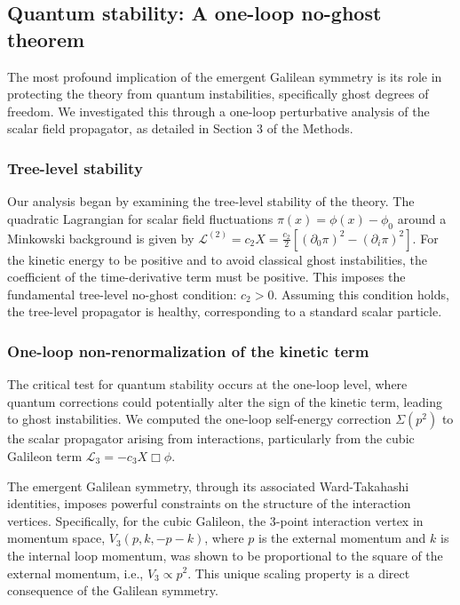 \documentclass[twocolumn]{aastex631}
\begin{document}
\subsection{Quantum stability: A one-loop no-ghost theorem}
The most profound implication of the emergent Galilean symmetry is its role in protecting the theory from quantum instabilities, specifically ghost degrees of freedom. We investigated this through a one-loop perturbative analysis of the scalar field propagator, as detailed in Section 3 of the Methods.

\subsubsection{Tree-level stability}
Our analysis began by examining the tree-level stability of the theory. The quadratic Lagrangian for scalar field fluctuations $\pi(x) = \phi(x) - \phi_0$ around a Minkowski background is given by $\mathcal{L}^{(2)} = c_2 X = \frac{c_2}{2} [(\partial_0\pi)^2 - (\partial_i\pi)^2]$. For the kinetic energy to be positive and to avoid classical ghost instabilities, the coefficient of the time-derivative term must be positive. This imposes the fundamental tree-level no-ghost condition: $c_2 > 0$. Assuming this condition holds, the tree-level propagator is healthy, corresponding to a standard scalar particle.

\subsubsection{One-loop non-renormalization of the kinetic term}
The critical test for quantum stability occurs at the one-loop level, where quantum corrections could potentially alter the sign of the kinetic term, leading to ghost instabilities. We computed the one-loop self-energy correction $\Sigma(p^2)$ to the scalar propagator arising from interactions, particularly from the cubic Galileon term $\mathcal{L}_3 = -c_3 X \Box\phi$.

The emergent Galilean symmetry, through its associated Ward-Takahashi identities, imposes powerful constraints on the structure of the interaction vertices. Specifically, for the cubic Galileon, the 3-point interaction vertex in momentum space, $V_3(p, k, -p-k)$, where $p$ is the external momentum and $k$ is the internal loop momentum, was shown to be proportional to the square of the external momentum, i.e., $V_3 \propto p^2$. This unique scaling property is a direct consequence of the Galilean symmetry.
\end{document}
